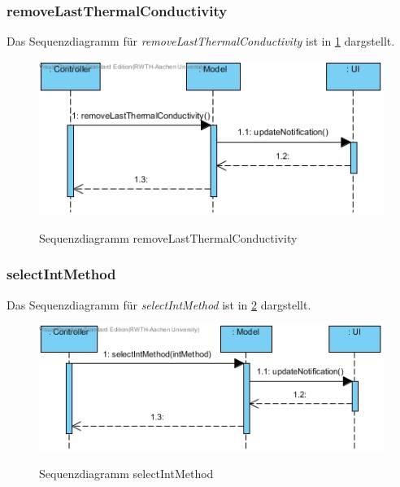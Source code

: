 \subsubsection*{removeLastThermalConductivity}

Das Sequenzdiagramm für \emph{removeLastThermalConductivity} ist in \ref{Sequenzdiagramm removeLastThermalConductivity} dargstellt.

\begin{figure}[H]
	\centering
	\includegraphics[scale=.6]{Bilder/Model__removeLastThermalConductivity().jpg}\\
	\caption{Sequenzdiagramm removeLastThermalConductivity}
	\label{Sequenzdiagramm removeLastThermalConductivity}
\end{figure}

\subsubsection*{selectIntMethod}

Das Sequenzdiagramm für \emph{selectIntMethod} ist in \ref{Sequenzdiagramm selectIntMethod} dargstellt.

\begin{figure}[H]
	\centering
	\includegraphics[scale=.6]{Bilder/Model__selectIntMethod().jpg}\\
	\caption{Sequenzdiagramm selectIntMethod}
	\label{Sequenzdiagramm selectIntMethod}
\end{figure}

